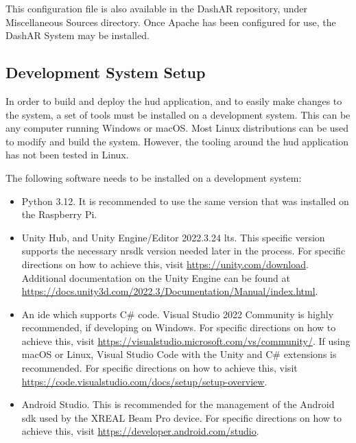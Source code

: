             \begin{singlespacecode}
                
            \end{singlespacecode}

            \par This configuration file is also available in the DashAR repository, under Miscellaneous Sources directory. Once Apache has been configured for use, the DashAR System may be installed.

        \subsection{Development System Setup}
            \par In order to build and deploy the \gls{hud} application, and to easily make changes to the system, a set of tools must be installed on a development system. This can be any computer running Windows or macOS. Most Linux distributions can be used to modify and build the system. However, the tooling around the \gls{hud} application has not been tested in Linux.

            \par The following software needs to be installed on a development system:

            \begin{itemize}
                \item Python 3.12. It is recommended to use the same version that was installed on the Raspberry Pi.
                \item Unity Hub, and Unity Engine/Editor 2022.3.24 \gls{lts}. This specific version supports the necessary \gls{nrsdk} version needed later in the process. For specific directions on how to achieve this, visit \url{https://unity.com/download}. Additional documentation on the Unity Engine can be found at \url{https://docs.unity3d.com/2022.3/Documentation/Manual/index.html}.
                \item An \gls{ide} which supports C\# code. Visual Studio 2022 Community is highly recommended, if developing on Windows. For specific directions on how to achieve this, visit \url{https://visualstudio.microsoft.com/vs/community/}. If using macOS or Linux, Visual Studio Code with the Unity and C\# extensions is recommended. For specific directions on how to achieve this, visit \url{https://code.visualstudio.com/docs/setup/setup-overview}.
                \item Android Studio. This is recommended for the management of the Android \gls{sdk} used by the XREAL Beam Pro device. For specific directions on how to achieve this, visit \url{https://developer.android.com/studio}.
            \end{itemize}

